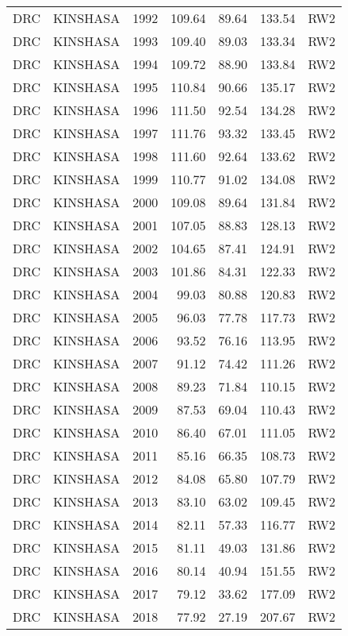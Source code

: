 \begin{longtable}{lllrrrl}
  DRC & KINSHASA & 1992 & 109.64 & 89.64 & 133.54 & RW2 \\ 
  DRC & KINSHASA & 1993 & 109.40 & 89.03 & 133.34 & RW2 \\ 
  DRC & KINSHASA & 1994 & 109.72 & 88.90 & 133.84 & RW2 \\ 
  DRC & KINSHASA & 1995 & 110.84 & 90.66 & 135.17 & RW2 \\ 
  DRC & KINSHASA & 1996 & 111.50 & 92.54 & 134.28 & RW2 \\ 
  DRC & KINSHASA & 1997 & 111.76 & 93.32 & 133.45 & RW2 \\ 
  DRC & KINSHASA & 1998 & 111.60 & 92.64 & 133.62 & RW2 \\ 
  DRC & KINSHASA & 1999 & 110.77 & 91.02 & 134.08 & RW2 \\ 
  DRC & KINSHASA & 2000 & 109.08 & 89.64 & 131.84 & RW2 \\ 
  DRC & KINSHASA & 2001 & 107.05 & 88.83 & 128.13 & RW2 \\ 
  DRC & KINSHASA & 2002 & 104.65 & 87.41 & 124.91 & RW2 \\ 
  DRC & KINSHASA & 2003 & 101.86 & 84.31 & 122.33 & RW2 \\ 
  DRC & KINSHASA & 2004 & 99.03 & 80.88 & 120.83 & RW2 \\ 
  DRC & KINSHASA & 2005 & 96.03 & 77.78 & 117.73 & RW2 \\ 
  DRC & KINSHASA & 2006 & 93.52 & 76.16 & 113.95 & RW2 \\ 
  DRC & KINSHASA & 2007 & 91.12 & 74.42 & 111.26 & RW2 \\ 
  DRC & KINSHASA & 2008 & 89.23 & 71.84 & 110.15 & RW2 \\ 
  DRC & KINSHASA & 2009 & 87.53 & 69.04 & 110.43 & RW2 \\ 
  DRC & KINSHASA & 2010 & 86.40 & 67.01 & 111.05 & RW2 \\ 
  DRC & KINSHASA & 2011 & 85.16 & 66.35 & 108.73 & RW2 \\ 
  DRC & KINSHASA & 2012 & 84.08 & 65.80 & 107.79 & RW2 \\ 
  DRC & KINSHASA & 2013 & 83.10 & 63.02 & 109.45 & RW2 \\ 
  DRC & KINSHASA & 2014 & 82.11 & 57.33 & 116.77 & RW2 \\ 
  DRC & KINSHASA & 2015 & 81.11 & 49.03 & 131.86 & RW2 \\ 
  DRC & KINSHASA & 2016 & 80.14 & 40.94 & 151.55 & RW2 \\ 
  DRC & KINSHASA & 2017 & 79.12 & 33.62 & 177.09 & RW2 \\ 
  DRC & KINSHASA & 2018 & 77.92 & 27.19 & 207.67 & RW2 \\ 

\end{longtable}
